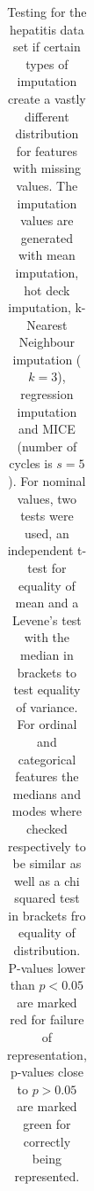 \documentclass[10pt,a4paper]{article}
\begin{document}
	\begin{table}
		\caption{Testing for the hepatitis data set if certain types of imputation create a vastly different distribution for features with missing values. The imputation values are generated with mean imputation, hot deck imputation, k-Nearest Neighbour imputation ($k = 3$), regression imputation and MICE (number of cycles is $s = 5$). For nominal values, two tests were used, an independent t-test for equality of mean and a Levene's test with the median in brackets to test equality of variance. For ordinal and categorical features the medians and modes where checked respectively to be similar as well as a chi squared test in brackets fro equality of distribution. P-values lower than $p < 0.05$ are marked red for failure of representation, p-values close to $p > 0.05$ are marked green for correctly being represented.}
		\label{tab:ImputationHepatitis}
		\begin{tabular}{l|lll|lll|lll|lll|lll}

\end{tabular}
\end{table}
\end{document}
